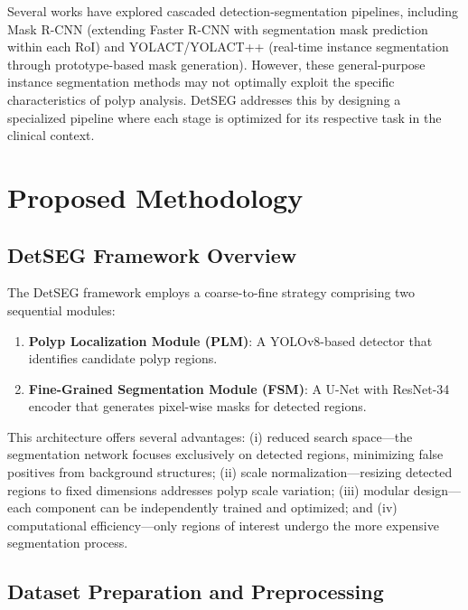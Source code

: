 \documentclass[conference]{IEEEtran}
\begin{document}
Several works have explored cascaded detection-segmentation pipelines, including Mask R-CNN (extending Faster R-CNN with segmentation mask prediction within each RoI) and YOLACT/YOLACT++ (real-time instance segmentation through prototype-based mask generation). However, these general-purpose instance segmentation methods may not optimally exploit the specific characteristics of polyp analysis. DetSEG addresses this by designing a specialized pipeline where each stage is optimized for its respective task in the clinical context.

\section{Proposed Methodology}

\subsection{DetSEG Framework Overview}

The DetSEG framework employs a coarse-to-fine strategy comprising two sequential modules:

\begin{enumerate}
    \item \textbf{Polyp Localization Module (PLM)}: A YOLOv8-based detector that identifies candidate polyp regions.
    \item \textbf{Fine-Grained Segmentation Module (FSM)}: A U-Net with ResNet-34 encoder that generates pixel-wise masks for detected regions.
\end{enumerate}

This architecture offers several advantages: (i) reduced search space---the segmentation network focuses exclusively on detected regions, minimizing false positives from background structures; (ii) scale normalization---resizing detected regions to fixed dimensions addresses polyp scale variation; (iii) modular design---each component can be independently trained and optimized; and (iv) computational efficiency---only regions of interest undergo the more expensive segmentation process.

\subsection{Dataset Preparation and Preprocessing}
\end{document}
